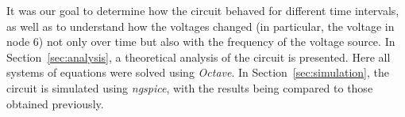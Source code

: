 
It was our goal to determine how the circuit behaved for different time intervals, as well as to understand how the voltages changed (in particular, the voltage in node 6) not only over time but also with the frequency of the voltage source. In Section~\ref{sec:analysis}, a theoretical analysis of the circuit is presented. Here all systems of equations were solved using \textit{Octave}. In Section~\ref{sec:simulation}, the circuit is simulated using \textit{ngspice}, with the results being compared to those obtained previously. %



